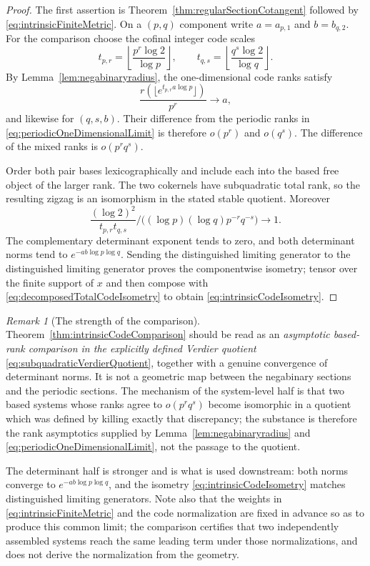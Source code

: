 \documentclass[11pt]{amsart}
\theoremstyle{definition}
\theoremstyle{remark}
\newtheorem{remark}[theorem]{Remark}
\begin{document}
\begin{proof}
The first assertion is Theorem~\ref{thm:regularSectionCotangent} followed by
\eqref{eq:intrinsicFiniteMetric}.  On a $(p,q)$ component write
$a=a_{p,1}$ and $b=b_{q,2}$.  For the comparison choose the cofinal integer
code scales
\[
 t_{p,r}=\left\lfloor\frac{p^r\log2}{\log p}\right\rfloor,
 \qquad
 t_{q,s}=\left\lfloor\frac{q^s\log2}{\log q}\right\rfloor.
\]
By Lemma~\ref{lem:negabinaryradius}, the one-dimensional code ranks satisfy
\[
 \frac{r(\lfloor e^{t_{p,r}a\log p}\rfloor)}{p^r}\longrightarrow a,
\]
and likewise for $(q,s,b)$.  Their difference from the periodic ranks in
\eqref{eq:periodicOneDimensionalLimit} is therefore $o(p^r)$ and $o(q^s)$.
The difference of the mixed ranks is $o(p^rq^s)$.

Order both pair bases lexicographically and include each into the based
free object of the larger rank.  The two cokernels have subquadratic total
rank, so the resulting zigzag is an isomorphism in the stated stable
quotient.  Moreover
\[
 \frac{(\log2)^2}{t_{p,r}t_{q,s}}
 \big/\bigl((\log p)(\log q)p^{-r}q^{-s}\bigr)
 \longrightarrow1.
\]
The complementary determinant exponent tends to zero, and both determinant
norms tend to $e^{-ab\log p\log q}$.  Sending the distinguished limiting
generator to the distinguished limiting generator proves
the componentwise isometry; tensor over the finite support of $x$ and then
compose with \eqref{eq:decomposedTotalCodeIsometry} to obtain
\eqref{eq:intrinsicCodeIsometry}.
\end{proof}

\begin{remark}[The strength of the comparison]
\label{rem:comparisonstrength}
Theorem~\ref{thm:intrinsicCodeComparison} should be read as an
\emph{asymptotic based-rank comparison in the explicitly defined Verdier
quotient} \eqref{eq:subquadraticVerdierQuotient}, together with a genuine
convergence of determinant norms.  It is not a geometric map between the
negabinary sections and the periodic sections.  The mechanism of the
system-level half is that two based systems whose ranks agree to $o(p^rq^s)$
become isomorphic in a quotient which was defined by killing exactly that
discrepancy; the substance is therefore the rank asymptotics supplied by
Lemma~\ref{lem:negabinaryradius} and
\eqref{eq:periodicOneDimensionalLimit}, not the passage to the quotient.

The determinant half is stronger and is what is used downstream: both norms
converge to $e^{-ab\log p\log q}$, and the isometry
\eqref{eq:intrinsicCodeIsometry} matches distinguished limiting generators.
Note also that the weights in \eqref{eq:intrinsicFiniteMetric} and the code
normalization are fixed in advance so as to produce this common limit; the
comparison certifies that two independently assembled systems reach the same
leading term under those normalizations, and does not derive the
normalization from the geometry.
\end{remark}
\end{document}
